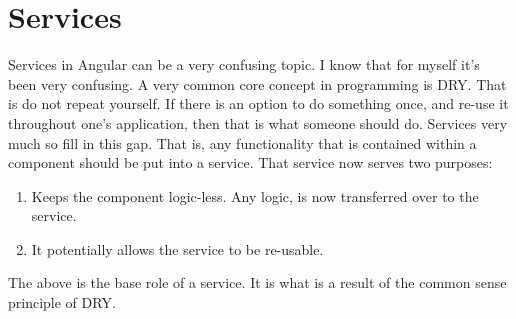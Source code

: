 \section{ Services }
\maketitle{}

Services in Angular can be a very confusing topic. I know that for myself it's
been very confusing. A very common core concept in programming is DRY. That is
do not repeat yourself. If there is an option to do something once, and re-use
it throughout one's application, then that is what someone should do. Services
very much so fill in this gap. That is, any functionality that is contained
within a component should be put into a service. That service now serves two
purposes:
\begin{enumerate}
  \item Keeps the component logic-less. Any logic, is now transferred over to
  the service.
  \item It potentially allows the service to be re-usable.
\end{enumerate}

The above is the base role of a service. It is what is a result of the common
sense principle of DRY. 
